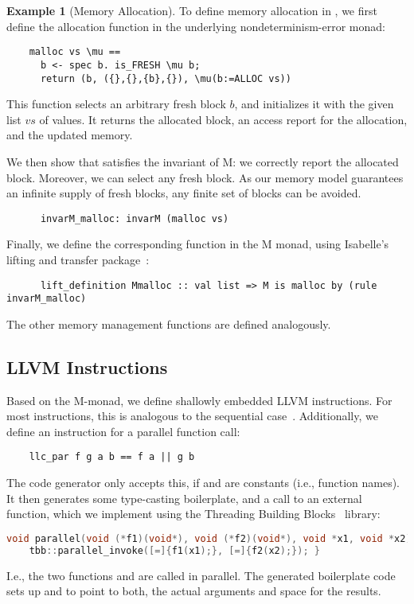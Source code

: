 \documentclass[sn-mathphys,Numbered]{sn-jnl}
\theoremstyle{thmstyleone}%
\theoremstyle{definition}%
\newtheorem{example}{Example}%
\theoremstyle{thmstylethree}%
\begin{document}
  \begin{example}[{Memory Allocation}]
    To define memory allocation in , we first define the allocation function in the underlying nondeterminism-error monad:
    \begin{lstlisting}
    malloc vs \mu ==
      b <- spec b. is_FRESH \mu b;
      return (b, ({},{},{b},{}), \mu(b:=ALLOC vs))
    \end{lstlisting}
    This function selects an arbitrary fresh block \is$b$, and initializes it with the given list \is$vs$ of values.
    It returns the allocated block, an access report for the allocation, and the updated memory.

    We then show that  satisfies the invariant of M: we correctly report the allocated block.
    Moreover, we can select any fresh block. As our memory model guarantees an infinite supply of fresh blocks,
    any finite set of blocks can be avoided.
    \begin{lstlisting}
      invarM_malloc: invarM (malloc vs)
    \end{lstlisting}

    Finally, we define the corresponding function in the M monad, using Isabelle's lifting and transfer package~\cite{HuKu13}:
    \begin{lstlisting}
      lift_definition Mmalloc :: val list => M is malloc by (rule invarM_malloc)
    \end{lstlisting}
    The other memory management functions are defined analogously.
  \end{example}

  \subsection{LLVM Instructions}
  Based on the M-monad, we define shallowly embedded LLVM instructions. For most instructions,
  this is analogous to the sequential case~\cite{La19-llvm}.
  Additionally, we define an instruction for a parallel function call:
  \begin{lstlisting}
    llc_par f g a b == f a || g b
  \end{lstlisting}
  The code generator only accepts this, if  and  are constants (i.e., function names).
  It then generates some type-casting boilerplate, and a call to an external
   function, which we implement using the Threading Building Blocks~\cite{TBB} library:
  \begin{lstlisting}[language=C++, basicstyle=\ttfamily]
  void parallel(void (*f1)(void*), void (*f2)(void*), void *x1, void *x2) {
    tbb::parallel_invoke([=]{f1(x1);}, [=]{f2(x2);}); }
  \end{lstlisting}
  I.e., the two functions  and  are called in parallel. The generated boilerplate code sets up  and  to point to both, the actual arguments and space for the results.
\end{document}
